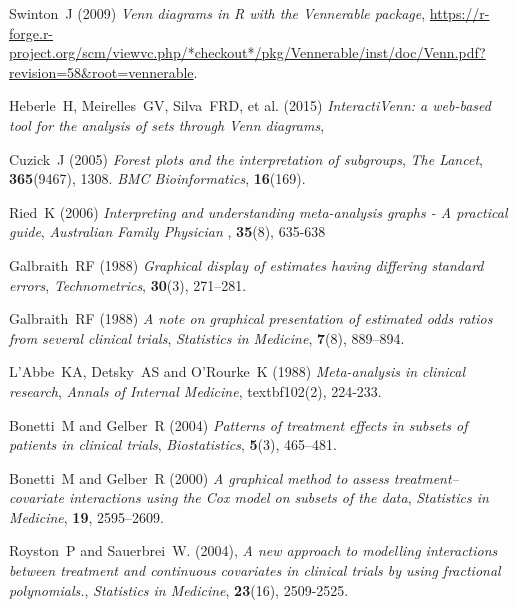\documentclass[Afour,sagev,times, doublespace]{sagej}
\begin{document}
{\begin{thebibliography}{99}
        Swinton~J (2009)
        \textit{Venn diagrams in R with the Vennerable package},
        \newblock\url{https://r-forge.r-project.org/scm/viewvc.php/*checkout*/pkg/Vennerable/inst/doc/Venn.pdf?revision=58&root=vennerable}.

         Heberle~H, Meirelles~GV, Silva~FRD, et al. (2015)
         \textit{InteractiVenn: a web-based tool for the analysis of sets through Venn diagrams},

		Cuzick~J (2005)
		\textit{Forest plots and the interpretation of subgroups},
		\newblock \emph{The Lancet}, \textbf{365}(9467), 1308.
         \newblock \emph{BMC Bioinformatics}, \textbf{16}(169).

		Ried~K (2006)
		\textit{Interpreting and understanding meta-analysis graphs - A practical guide},
		\newblock \emph{Australian Family Physician }, \textbf{35}(8), 635-638

		Galbraith~RF (1988)
		\textit{Graphical display of estimates having differing standard errors},
		\newblock \emph{Technometrics}, \textbf{30}(3), 271--281.	

		Galbraith~RF (1988)
		\textit{ A note on graphical presentation of estimated odds ratios from several clinical trials},
		\newblock \emph{Statistics in Medicine}, \textbf{7}(8), 889--894.	

         L'Abbe~KA, Detsky~AS and O'Rourke~K (1988)
         \textit{Meta-analysis in clinical research},
         \newblock \emph{Annals of Internal Medicine}, textbf{102}(2), 224-233.

		Bonetti~M and Gelber~R (2004)
		\textit{Patterns of treatment effects in subsets of patients in clinical trials},
		\newblock \emph{Biostatistics}, \textbf{5}(3), 465--481.	

		Bonetti~M and Gelber~R (2000)
		\textit{A graphical method to assess treatment–covariate interactions using the Cox model on subsets of the data},
		\newblock \emph{Statistics in Medicine}, \textbf{19}, 2595--2609.

         Royston~P and Sauerbrei~W. (2004),
         \textit{A new approach to modelling interactions between treatment and continuous covariates in clinical trials by using fractional polynomials.},
         \newblock \emph{Statistics in Medicine}, \textbf{23}(16), 2509-2525.


\end{thebibliography}}
\end{document}
